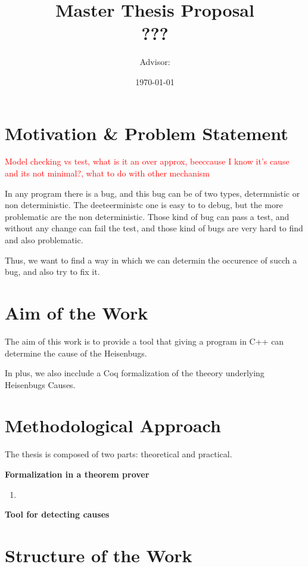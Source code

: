 \documentclass[12pt, a4paper]{article}
\title{
    \textbf{Master Thesis Proposal}\\
    ???
}
\author{Advisor: }
\date{\today}
\begin{document}
\maketitle
\tableofcontents
\newpage

\section{Motivation \& Problem Statement}

\textcolor{red}{Model checking vs test, what is it an over approx, beeccause I know it's cause and its not minimal?, what to do with other mechanism}

In any program there is a bug, and this bug can be of two types, determnistic or non deterministic. The deeteerministc one is easy to to debug, but the more problematic are the non deterministic. Those kind of bug can pass a test, and without any change can fail the test, and those kind of bugs are very hard to find and also problematic.

Thus, we want to find a way in which we can determin the occurence of succh a bug, and also try to fix it.

\newpage

\section{Aim of the Work}

The aim of this work is to provide a tool that giving a program in C++ can determine the cause of the Heisenbugs.

In plus, we also incclude a Coq formalization of the theeory underlying Heisenbugs Causes.

\newpage

\section{Methodological Approach}
The thesis is composed of two parts: theoretical and practical.

\textbf{Formalization in a theorem prover}

\begin{enumerate}
    \item 
\end{enumerate}

\textbf{Tool for detecting causes}

\newpage

\section{Structure of the Work}
\end{document}
